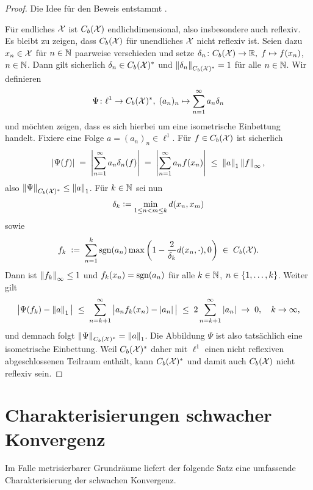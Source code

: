 \documentclass[../thesis/thesis.tex]{subfiles}
\begin{document}
	\begin{proof}
		Die Idee für den Beweis entstammt \cite{Martin.2019}.
		
		Für endliches $\mathcal{X}$ ist $C_b(\mathcal{X})$ endlichdimensional, also insbesondere auch reflexiv. 
		Es bleibt zu zeigen, dass $C_b(\mathcal{X})$ für unendliches $\mathcal{X}$ nicht reflexiv ist. Seien dazu $x_n \in \mathcal{X}$ für $n \in \mathbb{N}$ paarweise verschieden und setze
		$\delta_n \colon C_b(\mathcal{X}) \to \mathbb{R}, \; f \mapsto f(x_n) $, $n \in \mathbb{N}$. Dann gilt sicherlich $\delta_n \in C_b(\mathcal{X})^\ast$ und $\left\lVert\delta_n\right\rVert_{C_b(\mathcal{X})^\ast} = 1$ für alle $n \in \mathbb{N}$.
		Wir definieren
		\[ \Psi \colon \ell^1 \to C_b(\mathcal{X})^\ast, \; (a_n)_n \mapsto \sum_{n=1}^{\infty} a_n \delta_n  \]
		und möchten zeigen, dass es sich hierbei um eine isometrische Einbettung handelt. Fixiere eine Folge $a = (a_n)_n \in \ell^1$. Für $f \in C_b(\mathcal{X})$ ist sicherlich
		\[ \left| \Psi(f) \right| \; = \; \left| \sum_{n=1}^{\infty} a_n \delta_n(f) \right| \; = \; \left| \sum_{n=1}^{\infty} a_n f(x_n) \right| \; \leq \; \left\lVert a\right\rVert_1 \left\lVert f\right\rVert_{\infty} \text{,} \]
		also $\left\lVert\Psi\right\rVert_{C_b(\mathcal{X})^\ast} \leq \left\lVert a\right\rVert_1$. Für $k \in \mathbb{N}$ sei nun 
		\[\delta_k \vcentcolon = \min_{1 \leq n < m \leq k} d(x_n, x_m)\] 
		sowie
		\[ f_k \; \vcentcolon = \; \sum_{n=1}^{k} \mathrm{sgn}(a_n) \max \left( 1 - \frac{2}{\delta_k} d(x_n, \cdot), 0 \right) \; \in \; C_b(\mathcal{X}) \text{.} \]
		Dann ist $\left\lVert f_k\right\rVert_{\infty} \leq 1$ und $f_k(x_n) = \mathrm{sgn}(a_n)$ für alle $k \in \mathbb{N}$, $n \in \left\{1,\dots,k\right\}$. Weiter gilt
		\[ \big| \Psi(f_k) - \left\lVert a\right\rVert_1 \big| \; \leq \; \sum_{n=k+1}^{\infty} \big| a_n f_k(x_n) - \left| a_n \right| \big| 
		\; \leq \; 2 \sum_{n=k+1}^{\infty} \left| a_n \right| \; \to \; 0, \quad k \to \infty \text{,} \]
		und demnach folgt $\left\lVert\Psi\right\rVert_{C_b(\mathcal{X})^\ast} = \left\lVert a\right\rVert_1$. Die Abbildung $\Psi$ ist also tatsächlich eine isometrische Einbettung. Weil $C_b(\mathcal{X})^\ast$ daher mit $\ell^1$ einen nicht reflexiven
		abgeschlossenen Teilraum enthält, kann $C_b(\mathcal{X})^\ast$ und damit auch $C_b(\mathcal{X})$ nicht reflexiv sein.
	\end{proof}
	
	\section{Charakterisierungen schwacher Konvergenz}
	\label{subsec:charakterisierung_schwache_konvergenz}
	
	Im Falle metrisierbarer Grundräume liefert der folgende Satz eine umfassende Charakterisierung der schwachen Konvergenz.
	
\end{document}
